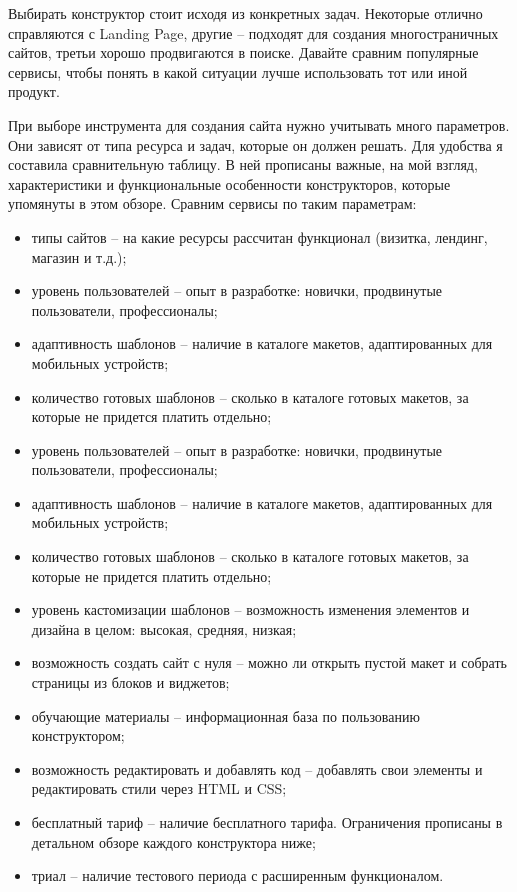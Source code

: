 Выбирать конструктор стоит исходя из конкретных задач. Некоторые отлично справляются с Landing Page, другие -- подходят для создания многостраничных сайтов, третьи хорошо продвигаются в поиске. Давайте сравним популярные сервисы, чтобы понять в какой ситуации лучше использовать тот или иной продукт.

При выборе инструмента для создания сайта нужно учитывать много параметров. Они зависят от типа ресурса и задач, которые он должен решать. Для удобства я составила сравнительную таблицу. В ней прописаны важные, на мой взгляд, характеристики и функциональные особенности конструкторов, которые упомянуты в этом обзоре.
Сравним сервисы по таким параметрам:

\begin{itemize}
  \item типы сайтов -- на какие ресурсы рассчитан функционал (визитка, лендинг, магазин и т.д.);
  \item уровень пользователей -- опыт в разработке: новички, продвинутые пользователи, профессионалы;
  \item адаптивность шаблонов -- наличие в каталоге макетов, адаптированных для мобильных устройств;
  \item количество готовых шаблонов -- сколько в каталоге готовых макетов, за которые не придется платить отдельно;
  \item уровень пользователей -- опыт в разработке: новички, продвинутые пользователи, профессионалы;
  \item адаптивность шаблонов -- наличие в каталоге макетов, адаптированных для мобильных устройств;
  \item количество готовых шаблонов -- сколько в каталоге готовых макетов, за которые не придется платить отдельно;
  \item уровень кастомизации шаблонов -- возможность изменения элементов и дизайна в целом: высокая, средняя, низкая;
  \item возможность создать сайт с нуля -- можно ли открыть пустой макет и собрать страницы из блоков и виджетов;
  \item обучающие материалы -- информационная база по пользованию конструктором;
  \item возможность редактировать и добавлять код -- добавлять свои элементы и редактировать стили через HTML и CSS;
  \item бесплатный тариф -- наличие бесплатного тарифа. Ограничения прописаны в детальном обзоре каждого конструктора ниже;
  \item триал -- наличие тестового периода с расширенным функционалом.

\end{itemize}
